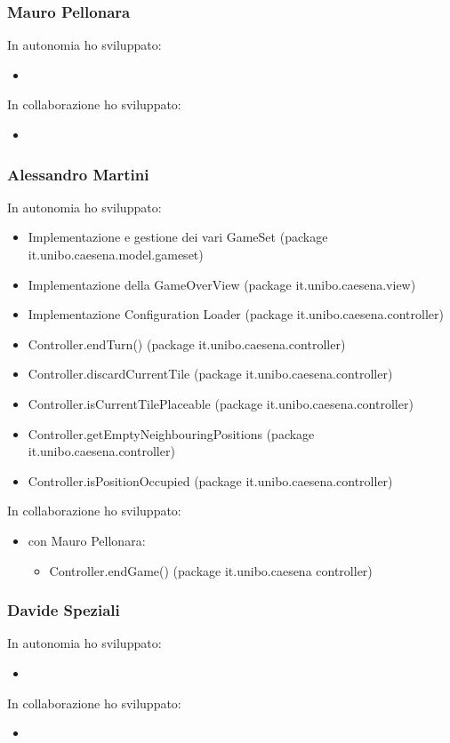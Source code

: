 \subsubsection*{Mauro Pellonara} 
In autonomia ho sviluppato:
\begin{itemize}
    \item 
\end{itemize}
In collaborazione ho sviluppato:
\begin{itemize}
    \item 
\end{itemize}

\subsubsection*{Alessandro Martini}
In autonomia ho sviluppato:
\begin{itemize}
    \item Implementazione e gestione dei vari GameSet (package it.unibo.caesena.model.gameset)
    \item Implementazione della GameOverView (package it.unibo.caesena.view)
    \item Implementazione Configuration Loader (package it.unibo.caesena.controller) 
    \item Controller.endTurn() (package it.unibo.caesena.controller)
    \item Controller.discardCurrentTile (package it.unibo.caesena.controller)
    \item Controller.isCurrentTilePlaceable (package it.unibo.caesena.controller)
    \item Controller.getEmptyNeighbouringPositions (package it.unibo.caesena.controller)
    \item Controller.isPositionOccupied (package it.unibo.caesena.controller)
\end{itemize}
In collaborazione ho sviluppato:
\begin{itemize}
    \item con Mauro Pellonara: 
    \begin{itemize}
        \item Controller.endGame() (package it.unibo.caesena controller)
    \end{itemize}
\end{itemize}

\subsubsection*{Davide Speziali}
In autonomia ho sviluppato:
\begin{itemize}
    \item 
\end{itemize}
In collaborazione ho sviluppato:
\begin{itemize}
    \item 
\end{itemize}

